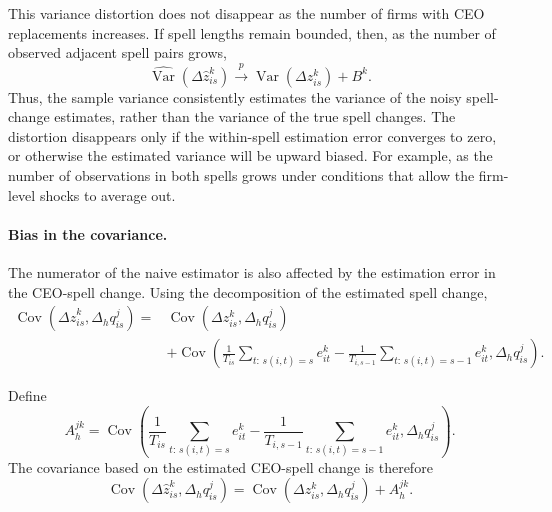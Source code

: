 \documentclass[11pt,a4paper]{article}
\begin{document}
This variance distortion does not disappear as the number
of firms with CEO replacements increases. If spell lengths remain bounded, then, as the number of observed adjacent spell pairs grows,
\begin{equation}
\widehat{\operatorname{Var}}\!\left(
\Delta\widehat z_{is}^{k}
\right)
\overset{p}{\longrightarrow}
\operatorname{Var}\!\left(
\Delta z_{is}^{k}
\right)
+
B^{k}.
\label{eq:variance_plim}
\end{equation}
Thus, the sample variance consistently estimates the variance of the
noisy spell-change estimates, rather than the variance of the true
spell changes. The distortion disappears only if the within-spell
estimation error converges to zero, or otherwise the estimated variance will be upward biased. For example, as the number of
observations in both spells grows under conditions that allow the
firm-level shocks to average out.
\vspace{.2cm}

\paragraph{Bias in the covariance.} The numerator of the naive estimator is also affected by the
estimation error in the CEO-spell change. Using the decomposition of
the estimated spell change,
\begin{align}
\operatorname{Cov}\!\left(
\Delta\widehat z_{is}^{k},
\Delta_h q_{is}^{j}
\right)
={}&
\operatorname{Cov}\!\left(
\Delta z_{is}^{k},
\Delta_h q_{is}^{j}
\right)
\nonumber\\
&+
\operatorname{Cov}\!\left(
\frac{1}{T_{is}}
\sum_{t:\,s(i,t)=s} e_{it}^{k}
-
\frac{1}{T_{i,s-1}}
\sum_{t:\,s(i,t)=s-1} e_{it}^{k},
\Delta_h q_{is}^{j}
\right).
\label{eq:covariance_decomposition}
\end{align}

Define
\begin{equation}
A_h^{jk}
=
\operatorname{Cov}\!\left(
\frac{1}{T_{is}}
\sum_{t:\,s(i,t)=s} e_{it}^{k}
-
\frac{1}{T_{i,s-1}}
\sum_{t:\,s(i,t)=s-1} e_{it}^{k},
\Delta_h q_{is}^{j}
\right).
\label{eq:A_definition}
\end{equation}
The covariance based on the estimated CEO-spell change is therefore
\begin{equation}
\operatorname{Cov}\!\left(
\Delta\widehat z_{is}^{k},
\Delta_h q_{is}^{j}
\right)
=
\operatorname{Cov}\!\left(
\Delta z_{is}^{k},
\Delta_h q_{is}^{j}
\right)
+
A_h^{jk}.
\label{eq:covariance_bias}
\end{equation}
\end{document}
